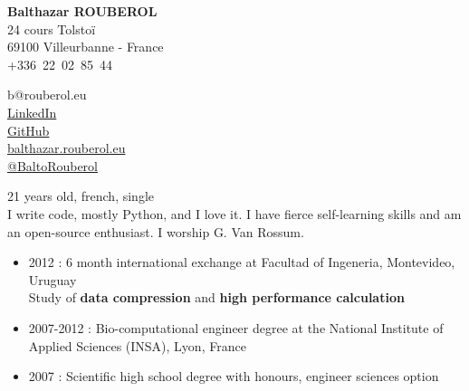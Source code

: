 


\pagestyle{empty}

\begin{minipage}{0.4\textwidth}
\raggedright
{
        \textbf{\Large Balthazar ROUBEROL}\\
        \medskip
        {\scriptsize 24 cours Tolstoï \\
        69100 Villeurbanne - France \\
        +336~22~02~85~44 \\
        }
}
\end{minipage}
\begin{minipage}{0.595\textwidth}
\raggedleft
{	
		{\scriptsize
		b@rouberol.eu\\
		\href{http://www.linkedin.com/profile/view?id=148957121\&locale=en\_US\&trk=tab\_pro}{LinkedIn}\\
		\href{https://github.com/BaltoRouberol}{GitHub}\\
		\href{http://balthazar.rouberol.eu}{balthazar.rouberol.eu}\\
        \href{https://twitter.com/BaltoRouberol}{@BaltoRouberol}\\
        
        }
}
\end{minipage}

\bigskip


{\scriptsize 21 years old, french, single\\I write code, mostly Python, and I love it. I have fierce self-learning skills and am an open-source enthusiast. I worship G. Van Rossum.}\\

\vspace{-7mm}

\begin{itemize}
\renewcommand{\labelitemi}{$\circ$}
		\item 2012 : 6 month international exchange at Facultad of Ingeneria, Montevideo, Uruguay\\ Study of \textbf{data compression} and \textbf{high performance calculation}
        \item 2007-2012 : Bio-computational engineer degree at the National Institute of Applied Sciences (INSA), Lyon, France
        \item 2007 : Scientific high school degree with honours, engineer sciences option
\end{itemize}

